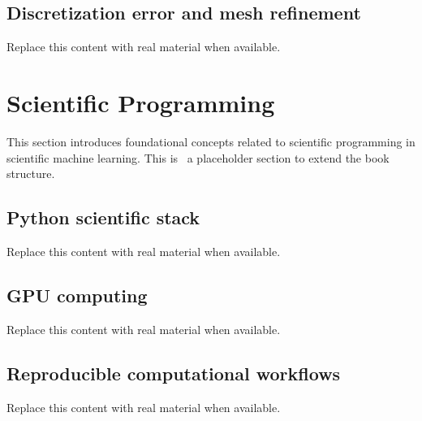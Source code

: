 \subsection{Discretization error and mesh refinement}
Replace this content with real material when available.

\section{Scientific Programming}
This section introduces foundational concepts related to scientific programming in scientific machine learning. This is~\cite{abdulmaksoudTransformerBasedSensorFusion2025} a placeholder section to extend the book structure.

\subsection{Python scientific stack}
Replace this content with real material when available.

\subsection{GPU computing}
Replace this content with real material when available.

\subsection{Reproducible computational workflows}
Replace this content with real material when available.
